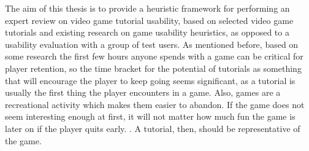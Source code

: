 The aim of this thesis is to provide a heuristic framework for performing an expert review on video game tutorial usability, based on selected video game tutorials and existing research on game usability heuristics, as opposed to a usability evaluation with a group of test users. As mentioned before, based on some research the first few hours anyone spends with a game can be critical for player retention, so the time bracket for the potential of tutorials as something that will encourage the player to keep going seems significant, as a tutorial is usually the first thing the player encounters in a game. Also, games are a recreational activity which makes them easier to abandon. If the game does not seem interesting enough at first, it will not matter how much fun the game is later on if the player quits early. \cite{Cheung2014}. A tutorial, then, should be representative of the game.